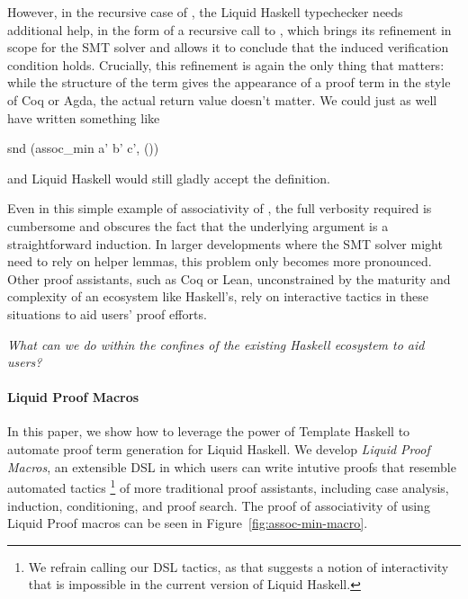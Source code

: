 However, in the recursive case of , the Liquid Haskell typechecker needs
additional help, in the form of a recursive call to , which
brings its refinement in scope for the SMT solver and allows it to conclude that
the induced verification condition holds. Crucially, this refinement is again the
only thing that matters: while the structure of the term gives the appearance
of a proof term in the style of Coq or Agda, the actual return value doesn't matter.
We could just as well have written something like
\begin{code}
  snd (assoc_min a' b' c', ())
\end{code}
and Liquid Haskell would still gladly accept the definition.

Even in this simple example of associativity of , the full
verbosity required is cumbersome and obscures the fact that the
underlying argument is a straightforward induction. In larger
developments where the SMT solver might need to rely on helper lemmas,
this problem only becomes more pronounced.  Other proof assistants,
such as Coq or Lean, unconstrained by the maturity and complexity of
an ecosystem like Haskell's, rely on interactive tactics in these
situations to aid users' proof efforts.

\smallskip

{\em What can we do within the confines of the existing Haskell
  ecosystem to aid users?}


\paragraph*{Liquid Proof Macros}

In this paper, we show how to leverage the power of Template Haskell
to automate proof term generation for Liquid Haskell.  We develop {\em
  Liquid Proof Macros}, an extensible DSL in which users can write
intutive proofs that resemble automated tactics%
\footnote{We refrain calling our DSL tactics, as that suggests a
  notion of interactivity that is impossible in the current version
  of Liquid Haskell.}%
%
of more traditional proof assistants, including case analysis,
induction, conditioning, and proof search. The proof of associativity
of  using Liquid Proof macros can be seen in
Figure~\ref{fig:assoc-min-macro}.

